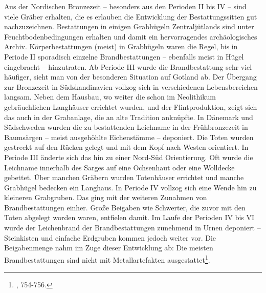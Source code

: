 \documentclass[openany,twoside,twocolumn]{book}
\let\rmarkdownfootnote\footnote%
\def\footnote{\protect\rmarkdownfootnote}
\begin{document}
Aus der Nordischen Bronzezeit -- besonders aus den Perioden II bis IV --
sind viele Gräber erhalten, die es erlauben die Entwicklung der
Bestattungssitten gut nachzuzeichnen. Bestattungen in einigen Grabhügeln
Zentraljütlands sind unter Feuchtbodenbedingungen erhalten und damit ein
hervorragendes archäologisches Archiv. Körperbestattungen (meist) in
Grabhügeln waren die Regel, bis in Periode II sporadisch einzelne
Brandbestattungen -- ebenfalls meist in Hügel eingebracht --
hinzutraten. Ab Periode III wurde die Brandbestattung sehr viel
häufiger, sieht man von der besonderen Situation auf Gotland ab. Der
Übergang zur Bronzezeit in Südskandinavien vollzog sich in verschiedenen
Lebensbereichen langsam. Neben dem Hausbau, wo weiter die schon im
Neolithikum gebräuchlichen Langhäuser errichtet wurden, und der
Flintproduktion, zeigt sich das auch in der Grabanlage, die an alte
Tradition anknüpfte. In Dänemark und Südschweden wurden die zu
bestattenden Leichname in der Frühbronzezeit in Baumsärgen -- meist
ausgehöhlte Eichenstämme -- deponiert. Die Toten wurden gestreckt auf
den Rücken gelegt und mit dem Kopf nach Westen orientiert. In Periode
III änderte sich das hin zu einer Nord-Süd Orientierung. Oft wurde die
Leichname innerhalb des Sarges auf eine Ochsenhaut oder eine Wolldecke
gebettet. Über manchen Gräbern wurden Totenhäuser errichtet und manche
Grabhügel bedecken ein Langhaus. In Periode IV vollzog sich eine Wende
hin zu kleineren Grabgruben. Das ging mit der weiteren Zunahmen von
Brandbestattungen einher. Große Beigaben wie Schwerter, die zuvor mit
den Toten abgelegt worden waren, entfielen damit. Im Laufe der Perioden
IV bis VI wurde der Leichenbrand der Brandbestattungen zunehmend in
Urnen deponiert -- Steinkisten und einfache Erdgruben kommen jedoch
weiter vor. Die Beigabenmenge nahm im Zuge dieser Entwicklung ab: Die
meisten Brandbestattungen sind nicht mit Metallartefakten
ausgestattet\footnote{\textcite{thrane_scandinavia_2013}, 754-756.}.
\end{document}
